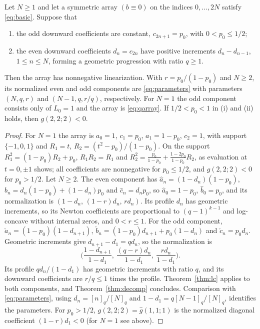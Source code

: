 \begin{corollary}\label{cor:parity}
Let $N\geq1$ and let a symmetric array $(b\equiv0)$ on the indices $0,\ldots,2N$ satisfy \eqref{eq:basic}. Suppose that
\begin{enumerate}
\item the odd downward coefficients are constant, $c_{2n+1}=p_0$, with $0<p_0\leq1/2$;
\item the even downward coefficients $d_n=c_{2n}$ have positive increments $d_n-d_{n-1}$, $1\leq n\leq N$, forming a geometric progression with ratio $q\geq1$.
\end{enumerate}
Then the array has nonnegative linearization. With $r=p_0/(1-p_0)$ and $N\geq2$, its normalized even and odd components are \eqref{eq:parameters} with parameters $(N,q,r)$ and $(N-1,q,r/q)$, respectively. For $N=1$ the odd component consists only of $L_0=1$ and the array is \eqref{eq:qarray}. If $1/2<p_0<1$ in (i) and (ii) holds, then $g(2,2;2)<0$.
\end{corollary}
\begin{proof}
For $N=1$ the array is $a_0=1$, $c_1=p_0$, $a_1=1-p_0$, $c_2=1$, with support $\{-1,0,1\}$ and $R_1=t$, $R_2=(t^2-p_0)/(1-p_0)$. On the support $R_1^2=(1-p_0)R_2+p_0$, $R_1R_2=R_1$ and $R_2^2=\frac{p_0}{1-p_0}+\frac{1-2p_0}{1-p_0}R_2$, as evaluation at $t=0,\pm1$ shows; all coefficients are nonnegative for $p_0\leq1/2$, and $g(2,2;2)<0$ for $p_0>1/2$. Let $N\geq2$. The even component has $\hat a_n=(1-d_n)(1-p_0)$, $\hat b_n=d_n(1-p_0)+(1-d_n)p_0$ and $\hat c_n=d_np_0$, so $\hat a_0=1-p_0$, $\hat b_0=p_0$, and its normalization is $(1-d_n,\,(1-r)d_n,\,rd_n)$. Its profile $d_n$ has geometric increments, so its Newton coefficients are proportional to $(q-1)^{k-1}$ and log-concave without internal zeros, and $0<r\leq1$. For the odd component, $\check a_n=(1-p_0)(1-d_{n+1})$, $\check b_n=(1-p_0)d_{n+1}+p_0(1-d_n)$ and $\check c_n=p_0d_n$. Geometric increments give $d_{n+1}-d_1=qd_n$, so the normalization is
\[
\Big(\frac{1-d_{n+1}}{1-d_1},\ \frac{(q-r)d_n}{1-d_1},\ \frac{rd_n}{1-d_1}\Big).
\]
Its profile $qd_n/(1-d_1)$ has geometric increments with ratio $q$, and its downward coefficients are $r/q\leq1$ times the profile. Theorem~\ref{thm:lc} applies to both components, and Theorem~\ref{thm:decomp} concludes. Comparison with \eqref{eq:parameters}, using $d_n=[n]_q/[N]_q$ and $1-d_1=q[N-1]_q/[N]_q$, identifies the parameters. For $p_0>1/2$, $g(2,2;2)=\hat g(1,1;1)$ is the normalized diagonal coefficient $(1-r)d_1<0$ (for $N=1$ see above).
\end{proof}

